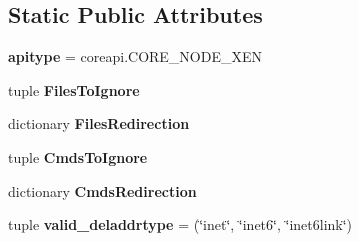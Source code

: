 \subsection*{Static Public Attributes}
\begin{DoxyCompactItemize}
\item 
\hypertarget{classcore_1_1xen_1_1xen_1_1_xen_node_a2922cb67033e42a28ae297fb4af6710d}{{\bfseries apitype} = coreapi.\+C\+O\+R\+E\+\_\+\+N\+O\+D\+E\+\_\+\+X\+E\+N}\label{classcore_1_1xen_1_1xen_1_1_xen_node_a2922cb67033e42a28ae297fb4af6710d}

\item 
tuple {\bfseries Files\+To\+Ignore}
\item 
dictionary {\bfseries Files\+Redirection}
\item 
tuple {\bfseries Cmds\+To\+Ignore}
\item 
dictionary {\bfseries Cmds\+Redirection}
\item 
\hypertarget{classcore_1_1xen_1_1xen_1_1_xen_node_af544a885c0e417a2a131e88db98c7304}{tuple {\bfseries valid\+\_\+deladdrtype} = (\char`\"{}inet\char`\"{}, \char`\"{}inet6\char`\"{}, \char`\"{}inet6link\char`\"{})}\label{classcore_1_1xen_1_1xen_1_1_xen_node_af544a885c0e417a2a131e88db98c7304}

\end{DoxyCompactItemize}



